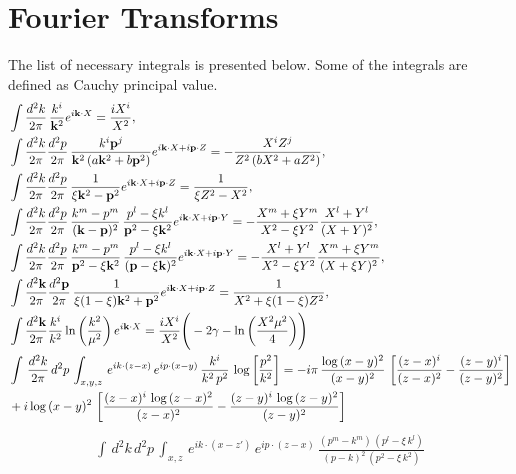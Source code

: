 \documentclass[aps,prd,amsmath,amssymb,nofootinbib]{revtex4-2}
\def\v#1{\mathbf{#1}}
\numberwithin{equation}{section}
\begin{document}
  \section{Fourier Transforms}
  The list of  necessary  integrals is presented below. Some of the integrals are defined as Cauchy principal value. 
  \begin{align}
    \label{i1} & \int\frac{d^{2}{k}}{2\pi}\,\frac{{k}^{i}}{\v{k}^{2}}e^{i\v{k}\cdot X}=\frac{iX^{i}}{X^{2}},  \\ 
    \label{i2} & \int\frac{d^{2}{k}}{2\pi}\frac{d^{2}{p}}{2\pi}\,\frac{{k}^{i}\mathbf{p}^{j}}{\mathbf{k}^{2}\left(a\mathbf{k}^{2}+b\mathbf{p}^{2}\right)}e^{i\mathbf{k}\cdot X+i\mathbf{p}\cdot Z}=-\frac{X^{i}Z^{j}}{Z^{2}\left(bX^{2}+aZ^{2}\right)},\\ 
  \label{i3} & \int\frac{d^{2}{k}}{2\pi}\frac{d^{2}{p}}{2\pi}\,\frac{1}{\xi \mathbf{k}^{2}- \mathbf{p}^{2}}e^{i\mathbf{k}\cdot X+i\mathbf{p}\cdot Z}=\frac{1}{\xi Z^2 -X^{2}}, \\
  \label{i4} & \int\frac{d^{2}{k}}{2\pi} \frac{d^{2}{p}}{2\pi}\,\frac{k^m - p^m }{(\v{k}-\v{p})^2} \,\frac{p^l - \xi k^l }{ \v{p}^2 -\xi \v{k}^2 }   e^{i\mathbf{k}\cdot X+i\mathbf{p}\cdot Y}
  =- \frac{X^m + \xi Y^m}{ X^2 - \xi Y^{2}}  \frac{X^l+Y^l} {(X+Y)^2},\\
  \label{i5} & \int\frac{d^{2}{k}}{2\pi} \frac{d^{2}{p}}{2\pi}\,\frac{k^m - p^m }{  \v{p}^2 -\xi \v{k}^2 } \,\frac{p^l - \xi k^l }{  (\v{p} - \xi \v{k})^2  }   e^{i\mathbf{k}\cdot X+i\mathbf{p}\cdot Y}
  =- \frac{X^l + Y^l}{ X^2 - \xi Y^{2}}  \frac{X^m+\xi Y^m} {(X+\xi Y)^2},\\
  \label{i7} & \int\frac{d^{2}\mathbf{k}}{2\pi}\frac{d^{2}\mathbf{p}}{2\pi}\,\frac{1}{\xi(1-\xi)\mathbf{k}^{2}+\mathbf{p}^{2}}e^{i\mathbf{k}\cdot X+i\mathbf{p}\cdot Z}=\frac{1}{X^{2}+\xi(1-\xi)Z^{2}}, \\ 
  \label{i8} & \int\frac{d^{2}\mathbf{k}}{2\pi}\frac{k^{i}}{k^{2}}\ln\bigg(\frac{k^{2}}{\mu^{2}}\bigg)\,e^{i\mathbf{k}\cdot X}= \frac{iX^{i}}{X^{2}}\Bigg(-2\gamma -\ln\bigg(\frac{X^{2}\mu^{2}}{4}\bigg)\Bigg) \\ 
  \label{i9} &  \int\, \frac{d^{2}k}{2\pi}\, d^{2}p\, \int_{x,y,z}\, e^{ik\cdot (z-x)}\, e^{ip\cdot (x-y)}\, \frac{k^{i}}{k^{2}\,p^{2}}\, \log{\left[\frac{p^{2}}{k^{2}}\right]}  = -i\pi\, \frac{\log{(x-y)^{2}}}{(x-y)^{2}}\, \left[\frac{(z-x)^{i}}{(z-x)^{2}}-\frac{(z-y)^{i}}{(z-y)^{2}}\right]\notag \\ & + i\log{(x-y)^{2}}\, \left[\frac{(z-x)^{i}\,\log{(z-x)^{2}}}{(z-x)^{2}}-\frac{(z-y)^{i}\, \log{(z-y)^{2}}}{(z-y)^{2}}\right]
\end{align}
\begin{align}
    \int\, d^{2}k\, d^{2}p\, \int_{x,z}\, e^{ik\cdot (x-z')}\, e^{ip\cdot (z-x)}\, \frac{(p^{m}-k^{m})\, (p^{l}-\xi\,k^{l})}{(p-k)^{2}\,(p^{2}-\xi\,k^{2})}
\end{align}
\end{document}
